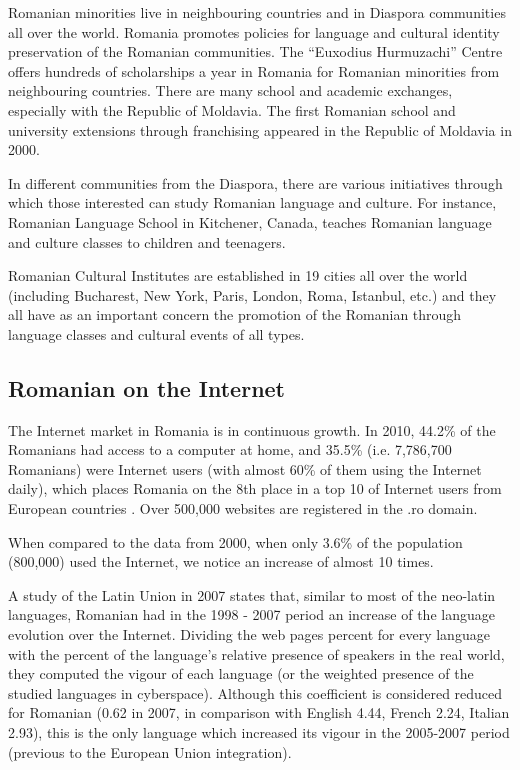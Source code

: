 \documentclass[]{../../metanetpaper}
\begin{document}
\begin{multicols}{2}
Romanian minorities live in neighbouring countries and in Diaspora communities all over the world. Romania promotes policies for language and cultural identity preservation of the Romanian communities. The “Euxodius Hurmuzachi” Centre offers hundreds of scholarships a year in Romania for Romanian minorities from neighbouring countries. There are many school and academic exchanges, especially with the Republic of Moldavia. The first Romanian school and university extensions through franchising appeared in the Republic of Moldavia in 2000.

In different communities from the Diaspora, there are various initiatives through which those interested can study Romanian language and culture. For instance, Romanian Language School in Kitchener, Canada, teaches Romanian language and culture classes to children and teenagers.

Romanian Cultural Institutes are established in 19 cities all over the world (including Bucharest, New York, Paris, London, Roma, Istanbul, etc.) and they all have as an important concern the promotion of the Romanian through language classes and cultural events of all types.

\subsection{Romanian on the Internet}

The Internet market in Romania is in continuous growth. In 2010, 44.2\% of the Romanians had access to a computer at home, and 35.5\% (i.e. 7,786,700 Romanians) were Internet users \cite{urlInternetStatsRO} (with almost 60\% of them using the Internet daily), which places Romania on the 8th place in a top 10 of Internet users from European countries \cite{urlInternetStatsEU}. Over 500,000 websites are registered in the .ro domain.

When compared to the data from 2000, when only 3.6\% of the population (800,000) used the Internet, we notice an increase of almost 10 times.

A study of the Latin Union in 2007 \cite{uniunealat} states that, similar to most of the neo-latin languages, Romanian had in the 1998 - 2007 period an increase of the language evolution over the Internet. Dividing the web pages percent for every language with the percent of the language’s relative presence of speakers in the real world, they computed the vigour of each language (or the weighted presence of the studied languages in cyberspace). Although this coefficient is considered reduced for Romanian (0.62 in 2007, in comparison with English 4.44, French 2.24, Italian 2.93), this is the only language which increased its vigour in the 2005-2007 period (previous to the European Union integration). 


\end{multicols}
\end{document}
